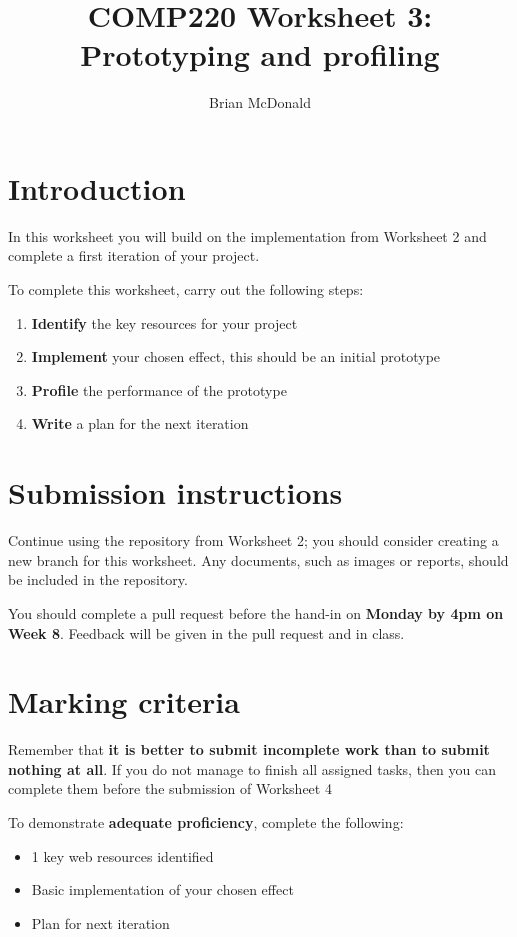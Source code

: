 \documentclass{../../../fal_assignment}
\title{COMP220 Worksheet 3: Prototyping and profiling}
\author{Brian McDonald}
\begin{document}
\maketitle

\section*{Introduction}

In this worksheet you will build on the implementation from Worksheet 2 and complete a first iteration of your project.

To complete this worksheet, carry out the following steps:
\begin{enumerate}[label=(\alph*)]
	\item \textbf{Identify} the key resources for your project
	\item \textbf{Implement} your chosen effect, this should be an initial prototype
	\item \textbf{Profile} the performance of the prototype
	\item \textbf{Write} a plan for the next iteration
\end{enumerate}

\section*{Submission instructions}

Continue using the repository from Worksheet 2; you should consider creating a new branch for this worksheet. Any documents, such as images or reports, should be included in the repository.

You should complete a pull request before the hand-in on \textbf{Monday by 4pm on Week 8}. Feedback will be given in the pull request and in class.

\section*{Marking criteria}

Remember that \textbf{it is better to submit incomplete work than to submit nothing at all}. If you do not manage to finish all assigned tasks, then you can complete them before the submission of Worksheet 4

To demonstrate \textbf{adequate proficiency}, complete the following:
\begin{itemize}
	\item 1 key web resources identified
	\item Basic implementation of your chosen effect
	\item Plan for next iteration
\end{itemize} 
\end{document}
